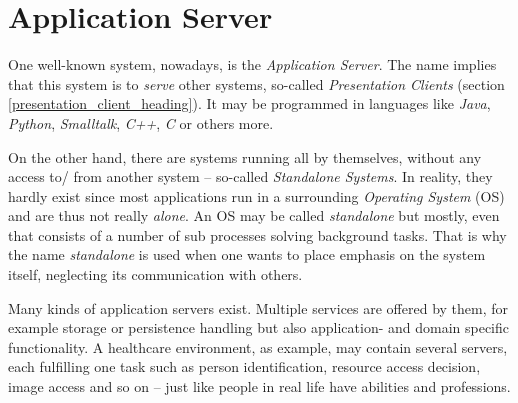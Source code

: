 %
%
%
%
%
%
%

\section{Application Server}
\label{application_server_heading}

One well-known system, nowadays, is the \emph{Application Server}. The name
implies that this system is to \emph{serve} other systems, so-called
\emph{Presentation Clients} (section \ref{presentation_client_heading}). It may
be programmed in languages like \emph{Java}, \emph{Python}, \emph{Smalltalk},
\emph{C++}, \emph{C} or others more.

On the other hand, there are systems running all by themselves, without any
access to/ from another system -- so-called \emph{Standalone Systems}. In
reality, they hardly exist since most applications run in a surrounding
\emph{Operating System} (OS) and are thus not really \emph{alone}. An OS may be
called \emph{standalone} but mostly, even that consists of a number of sub
processes solving background tasks. That is why the name \emph{standalone} is
used when one wants to place emphasis on the system itself, neglecting its
communication with others.

Many kinds of application servers exist. Multiple services are offered by them,
for example storage or persistence handling but also application- and domain
specific functionality. A healthcare environment, as example, may contain several
servers, each fulfilling one task such as person identification, resource access
decision, image access and so on -- just like people in real life have abilities
and professions.

